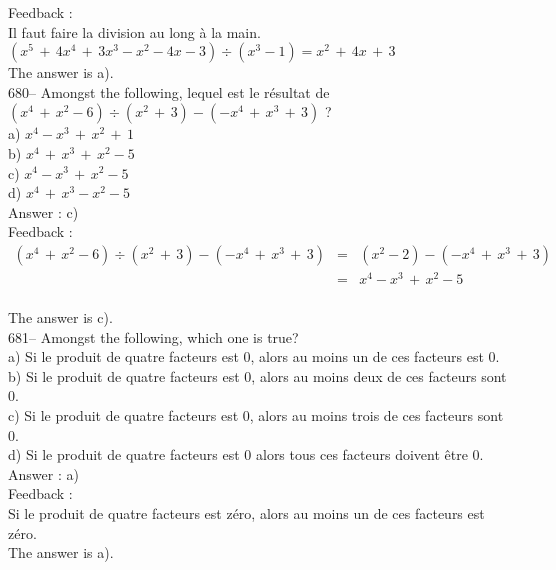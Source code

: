 \documentclass[letterpaper, 12pt]{article}
\begin{document}
Feedback :\\
Il faut faire la division au long \`a la main.  \\
$\left( x^{5}\,+\,4x^{4}\,+\,3x^{3}-x^{2}-4x-3\right) \div\left(
x^{3}-1\right)=x^{2}\,+\,4x\,+\,3$\\
The answer is a).\\

680-- Amongst the following, lequel est le r\'esultat de $\left(
x^{4}\,+\,x^{2}-6\right) \div\left( x^{2}\,+\,3\right) -\left(
-x^{4}\,+\,x^{3}\,+\,3\right)$ ?\\
a) $x^{4}-x^{3}\,+\,x^{2}\,+\,1$\\
b) $x^{4}\,+\,x^{3}\,+\,x^{2}-5$\\
c) $x^{4}-x^{3}\,+\,x^{2}-5$\\
d) $x^{4}\,+\,x^{3}-x^{2}-5$\\

Answer : c)\\

Feedback :\\
\begin{eqnarray*}
\left( x^{4}\,+\,x^{2}-6\right) \div\left( x^{2}\,+\,3\right) -\left(
-x^{4}\,+\,x^{3}\,+\,3\right)&=&\left( x^{2}-2\right)-\left(
-x^{4}\,+\,x^{3}\,+\,3\right)\\[1mm]
&=&x^{4}-x^{3}\,+\,x^{2}-5\\[1mm]
\end{eqnarray*}

The answer is c).\\

681-- Amongst the following, which one is true?\\
a) Si le produit de quatre facteurs est 0, alors au moins un de ces facteurs
est 0.  \\
b) Si le produit de quatre facteurs est 0, alors au moins deux de ces
facteurs sont 0.  \\
c) Si le produit de quatre facteurs est 0, alors au moins trois de ces
facteurs sont 0.  \\
d) Si le produit de quatre facteurs est 0 alors tous ces facteurs doivent
\^etre 0.\\

Answer : a)\\

Feedback : \\
Si le produit de quatre facteurs est z\'ero, alors au moins un de ces
facteurs est z\'ero.  \\
The answer is a).\\
\end{document}
